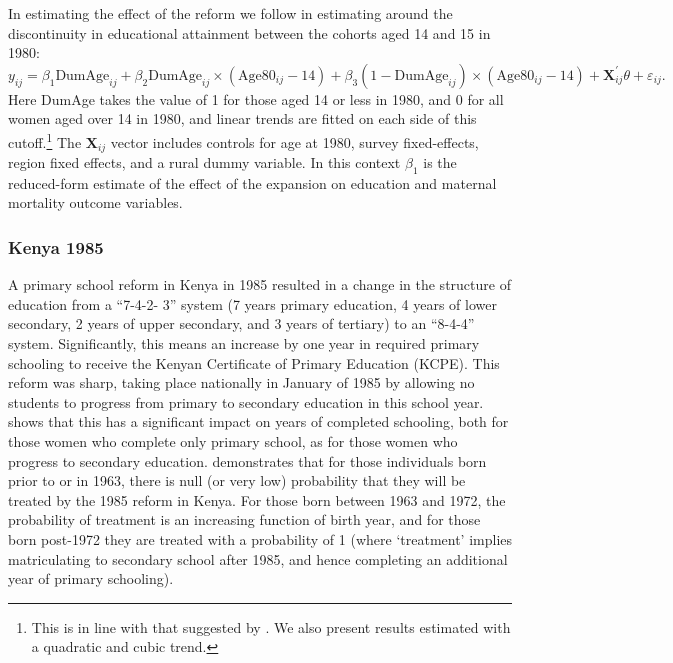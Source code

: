 \documentclass{article}[12pt,subeqn]
\begin{document}
\begin{spacing}{1.4}
In estimating the effect of the reform we follow \citet{AgueroBharawadj2011} in estimating around the
discontinuity in educational attainment between the cohorts aged 14 and 15 in 1980: 
\begin{equation}
 \label{eqn:Zimbabwe}
 y_{ij}=\beta_1\text{DumAge}_{ij}+\beta_2\text{DumAge}_{ij}\times(\text{Age}80_{ij}-14)+\beta_3(1-\text{DumAge}_{ij})\times(\text{Age}80_{ij}-14)+\textbf{X}^\prime_{ij}\theta+\varepsilon_{ij}.
\end{equation}
Here DumAge takes the value of 1 for those aged 14 or less in 1980, and 0 for all women aged over 14 in 
1980, and linear trends are fitted on each side of this cutoff.\footnote{This is in line with that suggested
by \citet{AgueroBharawadj2011}.  We also present results estimated with a quadratic and cubic trend.}
The $\textbf{X}_{ij}$ vector includes controls for age at 1980, survey fixed-effects, region fixed effects,
and a rural dummy variable.  In this context $\beta_1$ is the reduced-form estimate of the effect of the
expansion on education and maternal mortality outcome variables.

\subsubsection{Kenya 1985}
\label{ssscn:empiricsKenya}
A primary school reform in Kenya in 1985 resulted in a change in the structure of education from a ``7-4-2-
3'' system (7 years primary education, 4 years of lower secondary, 2 years of upper secondary, and 3 years of
tertiary) to an ``8-4-4'' system. Significantly, this means an increase by one year in required primary schooling
to receive the Kenyan Certificate of Primary Education (KCPE). This reform was sharp, taking place
nationally in January of 1985 by allowing no students to progress from primary to secondary education in this school
year. \citet{Chicoine2011} shows that this has a significant impact on years of completed schooling, both for
those women who complete only primary school, as for those women who progress to secondary education.
\citet{Chicoine2011} demonstrates that for those individuals born prior to or in 1963, there is null (or very low)
probability that they will be treated by the 1985 reform in Kenya. For those born between 1963 and 1972,
the probability of treatment is an increasing function of birth year, and for those born post-1972 they are
treated with a probability of 1 (where `treatment' implies matriculating to secondary school after 1985, and
hence completing an additional year of primary schooling).


\end{spacing}
\end{document}
